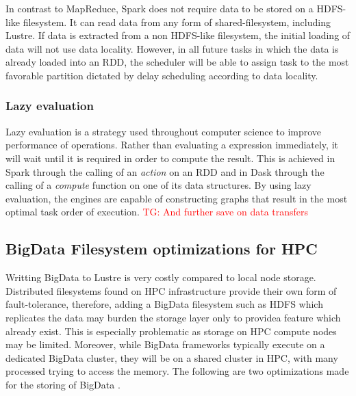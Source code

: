 \documentclass{report}
\newcommand{\tristan}[1]{\textcolor{red}{TG: #1}}
\begin{document}
                    In contrast to MapReduce, Spark does not require data to 
                    be stored on a HDFS-like filesystem. It can read data from
                    any form of shared-filesystem, including Lustre. If data 
                    is extracted from a non HDFS-like filesystem, the initial 
                    loading of data will not use data locality. However, in all
                    future tasks in which the data is already loaded into an 
                    RDD, the scheduler will be able to assign task to the most
                    favorable partition dictated by delay scheduling according
                    to data locality.

                    
                \subsubsection{Lazy evaluation}

                    Lazy evaluation is a strategy used throughout computer 
                    science to improve performance of operations. Rather than
                    evaluating a expression immediately, it will wait until it 
                    is required in order to compute the result. This is 
                    achieved in Spark through the calling of an \textit{action}
                    on an RDD and in Dask through the calling of a 
                    \textit{compute} function on one of its data structures.
                    By using lazy evaluation, the engines are capable of 
                    constructing graphs that result in the most optimal
                    task order of execution. \tristan{And further save on data transfers}

            \subsection{BigData Filesystem optimizations for HPC}

                Writting BigData to Lustre is very costly compared to local 
                node storage. Distributed filesystems found on HPC 
                infrastructure provide their own form of fault-tolerance, 
                therefore, adding a BigData filesystem such as HDFS which 
                replicates the data may burden the storage layer only to 
                providea feature which already exist. This is especially 
                problematic as storage on HPC compute nodes may be limited.
                Moreover, while BigData frameworks typically execute on a 
                dedicated BigData cluster, they will be on a shared cluster in
                HPC, with many processed trying to access the memory. The 
                following are two optimizations made for the storing of BigData
                .
\end{document}
